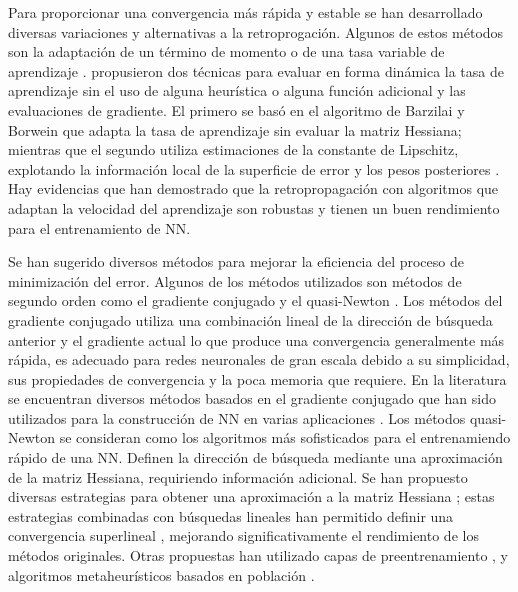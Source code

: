 Para proporcionar una convergencia más rápida y estable se han desarrollado diversas variaciones y alternativas a la retroprogación. Algunos de estos métodos son la adaptación de un término de momento \cite{Jacobs1988, Rumelhart1986b} o de una tasa variable de aprendizaje \cite{Jacobs1988, Vogl1988}.  propusieron dos técnicas para evaluar en forma dinámica la tasa de aprendizaje sin el uso de alguna heurística o alguna función adicional y las evaluaciones de gradiente. El primero se basó en el algoritmo de Barzilai y Borwein \cite{Barzilai1988} que adapta la tasa de aprendizaje sin evaluar la matriz Hessiana; mientras que el segundo utiliza estimaciones de la constante de Lipschitz, explotando la información local de la superficie de error y los pesos posteriores \cite{Magoulas1997}. Hay evidencias \cite{Magoulas1997, Plagianakos2002, Plagianakos1998} que han demostrado que la retropropagación con algoritmos que adaptan la velocidad del aprendizaje son robustas y tienen un buen rendimiento para el entrenamiento de NN.

Se han sugerido diversos métodos para mejorar la eficiencia del proceso de minimización del error. Algunos de los métodos utilizados son métodos de segundo orden como el gradiente conjugado \cite{Fletcher1964, Hestenes1952, Polak1969} y el quasi-Newton \cite{Huang1970, Nocedal2006}. Los métodos del gradiente conjugado utiliza una combinación lineal de la dirección de búsqueda anterior y el gradiente actual lo que produce una convergencia generalmente más rápida, es adecuado para redes neuronales de gran escala debido a su simplicidad, sus propiedades de convergencia y la poca memoria que requiere. En la literatura  se encuentran diversos métodos basados en el gradiente conjugado \cite{Birgin2001, Moller1993} que han sido utilizados para la construcción de NN en varias aplicaciones \cite{Charalambous1992, Peng2007, Sotiropoulos2002}. Los métodos quasi-Newton se consideran como los algoritmos más sofisticados para el entrenamiendo rápido de una NN. Definen la dirección de búsqueda mediante una aproximación de la matriz Hessiana, requiriendo información adicional. Se han propuesto diversas estrategias para  obtener una aproximación a la matriz Hessiana \cite{Al-Baali1998, Nocedal1993, Oren1972, Oren1974, Yin2007}; estas estrategias combinadas con búsquedas lineales han permitido definir una convergencia superlineal \cite{Yin2007}, mejorando significativamente el rendimiento de los métodos originales. Otras propuestas han utilizado capas de preentrenamiento \cite{Hinton2006b}, y algoritmos metaheurísticos basados en población \cite{Lamos2012}.

